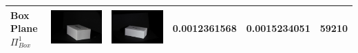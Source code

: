 \documentclass[final,12pt,3p]{elsarticle}
\begin{document}
\begin{table}[!ht]
{\begin{tabular}{| l | >{\centering\arraybackslash} m{2.5cm} | >{\centering\arraybackslash} m{2.5cm} | c | c | c |}
   Box Plane $\Pi_{Box}^{1}$ & \includegraphics[scale=0.05]{./box_cam1.JPG} & \includegraphics[scale=0.05]{./box_cam2.JPG} & 0.0012361568 & 0.0015234051 & 59210\\
   \hline

\end{tabular}}
\end{table}
\end{document}
